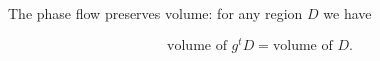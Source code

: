 The phase flow preserves volume: for any region $D$ we have

$$\text{volume of } g^t D = \text{volume of } D.$$
